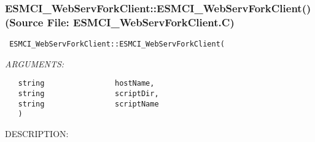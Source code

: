  
\setlength{\oldparskip}{\parskip}
\setlength{\parskip}{1.5ex}
\setlength{\oldparindent}{\parindent}
\setlength{\parindent}{0pt}
\setlength{\oldbaselineskip}{\baselineskip}
\setlength{\baselineskip}{11pt}
 
\def\bv{\begin{verbatim}}
\def\ev{\end{verbatim}}
\def\be{\begin{equation}}
\def\ee{\end{equation}}
\def\bea{\begin{eqnarray}}
\def\eea{\end{eqnarray}}
\def\bi{\begin{itemize}}
\def\ei{\end{itemize}}
\def\bn{\begin{enumerate}}
\def\en{\end{enumerate}}
\def\bd{\begin{description}}
\def\ed{\end{description}}
\def\({\left (}
\def\){\right )}
\def\[{\left [}
\def\]{\right ]}
\def\<{\left  \langle}
\def\>{\right \rangle}
\def\cI{{\cal I}}
\def\diag{\mathop{\rm diag}}
\def\tr{\mathop{\rm tr}}


 
\subsubsection{ESMCI\_WebServForkClient::ESMCI\_WebServForkClient() (Source File: ESMCI\_WebServForkClient.C)}


  
\begin{verbatim} ESMCI_WebServForkClient::ESMCI_WebServForkClient(\end{verbatim}{\em ARGUMENTS:}
\begin{verbatim}   string                hostName,
   string                scriptDir,
   string                scriptName
   )\end{verbatim}
{\sf DESCRIPTION:\\ }


